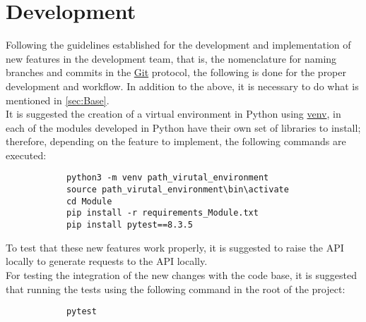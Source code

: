 \documentclass[12pt,a4paper]{article}
\begin{document}
    \newpage

    \section{Development}
    {
        Following the guidelines established for the development and implementation 
        of new features in the development team, that is, the nomenclature for naming 
        branches and commits in the \href{https://git-scm.com/}{Git} protocol, the 
        following is done for the proper development and workflow. In addition to 
        the above, it is necessary to do what is mentioned in \ref{sec:Base}.\\
    
        It is suggested the creation of a virtual environment in Python using 
        \href{https://docs.python.org/3/library/venv.html}{venv}, in each of 
        the modules developed in Python have their own set of libraries to 
        install; therefore, depending on the feature to implement, the following 
        commands are executed:

        \begin{verbatim}
            python3 -m venv path_virutal_environment 
            source path_virutal_environment\bin\activate
            cd Module
            pip install -r requirements_Module.txt
            pip install pytest==8.3.5
        \end{verbatim}

        To test that these new features work properly, it is suggested to raise the API 
        locally to generate requests to the API locally.\\

        For testing the integration of the new changes with the code base, it is suggested 
        that running the tests using the following command in the root of the project:

        \begin{verbatim}
            pytest
        \end{verbatim}
    }

    \newpage
\end{document}

